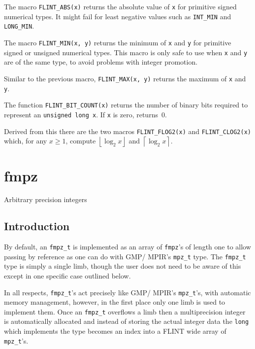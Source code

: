 \documentclass[a4paper,10pt]{book}
\providecommand{\floor}[1]{\left\lfloor#1\right\rfloor}%
\providecommand{\ceil}[1]{\left\lceil#1\right\rceil}%
\newcommand{\code}{\lstinline}
\begin{document}
The macro \code{FLINT_ABS(x)} returns the absolute value of \code{x}
for primitive signed numerical types.  It might fail for least negative 
values such as \code{INT_MIN} and \code{LONG_MIN}.

The macro \code{FLINT_MIN(x, y)} returns the minimum of \code{x} and 
\code{y} for primitive signed or unsigned numerical types.  This macro 
is only safe to use when \code{x} and \code{y} are of the same type, 
to avoid problems with integer promotion.

Similar to the previous macro, \code{FLINT_MAX(x, y)} returns the 
maximum of \code{x} and \code{y}.

The function \code{FLINT_BIT_COUNT(x)} returns the number of binary bits 
required to represent an \code{unsigned long x}.  If \code{x} is zero, 
returns~$0$.

Derived from this there are the two macros \code{FLINT_FLOG2(x)} and 
\code{FLINT_CLOG2(x)} which, for any $x \geq 1$, compute $\floor{\log_2{x}}$ 
and $\ceil{\log_2{x}}$.


\chapter{fmpz}
\epigraph{Arbitrary precision integers}{}

\section{Introduction}

By default, an \code{fmpz_t} is implemented as an array of \code{fmpz}'s of 
length one to allow passing by reference as one can do with GMP/ MPIR's 
\code{mpz_t} type.  The \code{fmpz_t} type is simply a single limb, though 
the user does not need to be aware of this except in one specific case 
outlined below.

In all respects, \code{fmpz_t}'s act precisely like GMP/ MPIR's 
\code{mpz_t}'s, with automatic memory management, however, in the first 
place only one limb is used to implement them.  Once an \code{fmpz_t} 
overflows a limb then a multiprecision integer is automatically allocated 
and instead of storing the actual integer data the \code{long} which 
implements the type becomes an index into a FLINT wide array of 
\code{mpz_t}'s.
\end{document}
